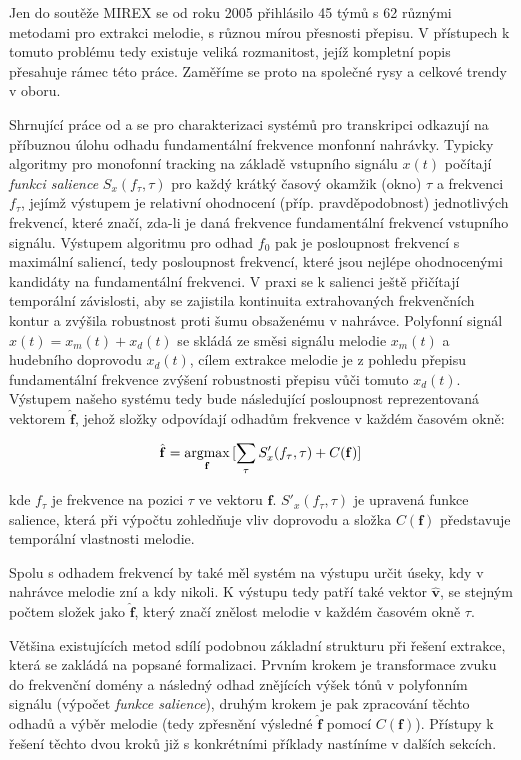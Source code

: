 Jen do soutěže MIREX se od roku 2005 přihlásilo 45 týmů s 62 různými metodami pro extrakci melodie, s různou mírou přesnosti přepisu. V přístupech k tomuto problému tedy existuje veliká rozmanitost, jejíž kompletní popis přesahuje rámec této práce. Zaměříme se proto na společné rysy a celkové trendy v oboru. 

Shrnující práce od \cite{Poliner2007} a \cite{Salamon2014} se pro charakterizaci systémů pro transkripci odkazují na příbuznou úlohu odhadu fundamentální frekvence monfonní nahrávky. Typicky algoritmy pro monofonní tracking na základě vstupního signálu $x(t)$ počítají \textit{funkci salience} $S_x(f_\tau, \tau)$ pro každý krátký časový okamžik (okno) $\tau$ a frekvenci $f_\tau$, jejímž výstupem je relativní ohodnocení (příp. pravděpodobnost) jednotlivých frekvencí, které značí, zda-li je daná frekvence fundamentální frekvencí vstupního signálu. Výstupem algoritmu pro odhad $f_0$ pak je posloupnost frekvencí s maximální saliencí, tedy posloupnost frekvencí, které jsou nejlépe ohodnocenými kandidáty na fundamentální frekvenci. V praxi se k salienci ještě přičítají temporální závislosti, aby se zajistila kontinuita extrahovaných frekvenčních kontur a zvýšila robustnost proti šumu obsaženému v nahrávce. 
Polyfonní signál $x(t) = x_m(t) + x_d(t)$ se skládá ze směsi signálu melodie $x_m(t)$ a hudebního doprovodu $x_d(t)$, cílem extrakce melodie je z pohledu přepisu fundamentální frekvence zvýšení robustnosti přepisu vůči tomuto  $x_d(t)$. Výstupem našeho systému tedy bude následující posloupnost reprezentovaná vektorem $\hat{\mathbf{f}}$, jehož složky odpovídají odhadům frekvence v každém časovém okně:

    $$\hat{\mathbf{f}} = \argmax_{\mathbf{f}}{[\sum_{\tau}{S'_x(f_\tau, \tau)} + C(\mathbf{f})]}$$

kde $f_\tau$ je frekvence na pozici $\tau$ ve vektoru $\mathbf{f}$. $S'_x(f_\tau, \tau)$ je upravená funkce salience, která při výpočtu zohledňuje vliv doprovodu a složka $C(\mathbf{f})$ představuje temporální vlastnosti melodie. 

Spolu s odhadem frekvencí by také měl systém na výstupu určit úseky, kdy v nahrávce melodie zní a kdy nikoli. K výstupu tedy patří také vektor $\hat{\mathbf{v}}$, se stejným počtem složek jako $\hat{\mathbf{f}}$, který značí znělost melodie v každém časovém okně $\tau$.

Většina existujících metod sdílí podobnou základní strukturu při řešení extrakce, která se zakládá na popsané formalizaci. Prvním krokem je transformace zvuku do frekvenční domény a následný odhad znějících výšek tónů v polyfonním signálu (výpočet \textit{funkce salience}), druhým krokem je pak zpracování těchto odhadů a výběr melodie (tedy zpřesnění výsledné $\hat{\mathbf{f}}$ pomocí $C(\mathbf{f})$). Přístupy k řešení těchto dvou kroků již s konkrétními příklady nastíníme v dalších sekcích.

